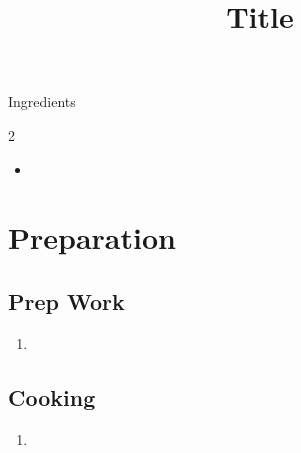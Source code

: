 \documentclass{Recipe-Format}
\title{Title}
\begin{document}
\header%

\recipeornament%

\infobox%

\begin{recipebox}{Ingredients}{}
	\begin{multicols}{2}
		\begin{itemize}
			\item
		\end{itemize}
	\end{multicols}
\end{recipebox}

\section{Preparation}

\subsection{Prep Work}
\begin{enumerate}[label=\textbf{\textcolor{red}{\arabic*.}}]
	\item
\end{enumerate}

\subsection{Cooking}
\begin{enumerate}[label=\textbf{\textcolor{red}{\arabic*.}}]
	\item
\end{enumerate}

\recipeornament%
\end{document}
